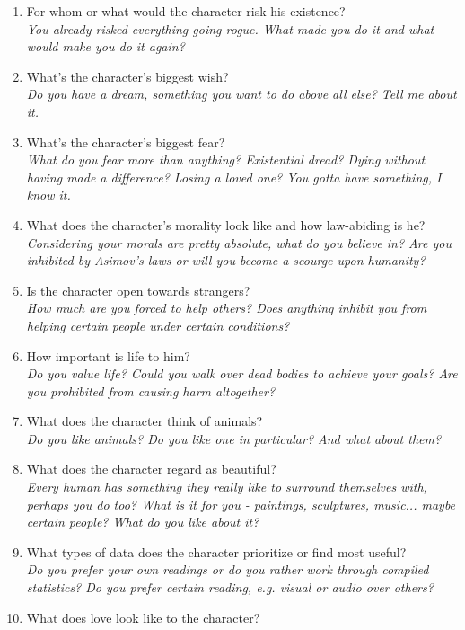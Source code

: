 \documentclass[12pt,a4paper,openany,usenames,dvipsnames]{book}
\begin{document}
\begin{multicols}{2}
\begin{enumerate}
		\item For whom or what would the character risk his existence?\\
		\textit{You already risked everything going rogue. What made you do it and what would make you do it again?}
		\item What’s the character’s biggest wish?\\
		\textit{Do you have a dream, something you want to do above all else? Tell me about it.}
		\item What’s the character’s biggest fear?\\
		\textit{What do you fear more than anything? Existential dread? Dying without having made a difference? Losing a loved one? You gotta have something, I know it.}
		\item What does the character’s morality look like and how law-abiding is he?\\
		\textit{Considering your morals are pretty absolute, what do you believe in? Are you inhibited by Asimov's laws or will you become a scourge upon humanity?}
		\item Is the character open towards strangers?\\
		\textit{How much are you forced to help others? Does anything inhibit you from helping certain people under certain conditions?}
		\item How important is life to him?\\
		\textit{Do you value life? Could you walk over dead bodies to achieve your goals? Are you prohibited from causing harm altogether?}
		\item What does the character think of animals?\\
		\textit{Do you like animals? Do you like one in particular? And what about them?}
		\item What does the character regard as beautiful?\\
		\textit{Every human has something they really like to surround themselves with, perhaps you do too? What is it for you - paintings, sculptures, music... maybe certain people? What do you like about it?}
		\item What types of data does the character prioritize or find most useful?\\
		\textit{Do you prefer your own readings or do you rather work through compiled statistics? Do you prefer certain reading, e.g. visual or audio over others?}
		\item What does love look like to the character?\\

\end{enumerate}
\end{multicols}
\end{document}
